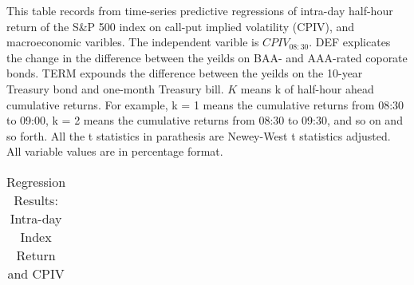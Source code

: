 \begin{table}[h]
\begin{threeparttable}
\end{threeparttable}

\end{table}




\begin{table}[h]

\caption{Regression Results:  Intra-day Index Return and CPIV}\label{table:regression4}
\begin{threeparttable}

\medskip
\begin{spacing}{1.1}
{\scriptsize  
This table records from time-series predictive regressions of intra-day half-hour return of the S\&P 500 index on call-put implied volatility (CPIV), and macroeconomic varibles. The independent varible is $CPIV_{08:30}$. DEF explicates the change in the difference between the yeilds on BAA- and AAA-rated coporate bonds. TERM expounds the difference between the yeilds on the 10-year Treasury bond and one-month Treasury bill. $K$ means k of half-hour ahead cumulative returns. For example, k = 1 means the cumulative returns from 08:30 to 09:00, k = 2 means the cumulative returns from 08:30 to 09:30, and so on and so forth. All the t statistics in parathesis are Newey-West t statistics adjusted. All variable values are in percentage format. 
}
\end{spacing}
\medskip
\tiny

\begin{tabular}{ccccccccccccccc}
\toprule


\end{tabular}
\end{threeparttable}
\end{table}
